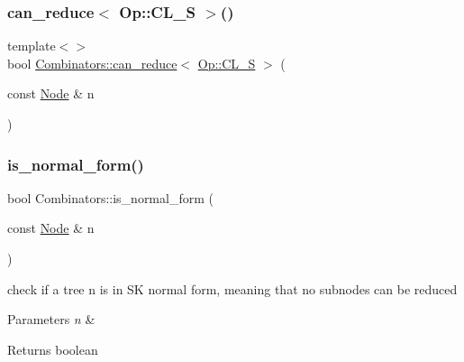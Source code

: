 \mbox{\label{namespace_combinators_aa038cd10e92daa6feb9f9010f705fb33}} 
\subsubsection{\texorpdfstring{can\+\_\+reduce$<$ Op\+::\+C\+L\+\_\+\+S $>$()}{can\_reduce< Op::CL\_S >()}}
{\footnotesize\ttfamily template$<$$>$ \\
bool \hyperlink{namespace_combinators_aa3c93f1edab6764d54dda56aafac9cd3}{Combinators\+::can\+\_\+reduce}$<$ \hyperlink{_ops_8h_a588e6b56097e045c733b60d25c4d45aba7a08f6d182bdbb1be7e6b1eb6092b27b}{Op\+::\+C\+L\+\_\+S} $>$ (\begin{DoxyParamCaption}\item[{const \hyperlink{class_node}{Node} \&}]{n }\end{DoxyParamCaption})}

\mbox{\label{namespace_combinators_a29877c1bfde5b9807fd7a7538efe9e0c}} 
\subsubsection{\texorpdfstring{is\+\_\+normal\+\_\+form()}{is\_normal\_form()}}
{\footnotesize\ttfamily bool Combinators\+::is\+\_\+normal\+\_\+form (\begin{DoxyParamCaption}\item[{const \hyperlink{class_node}{Node} \&}]{n }\end{DoxyParamCaption})}



check if a tree n is in SK normal form, meaning that no subnodes can be reduced 


\begin{DoxyParams}{Parameters}
{\em n} & \\
\hline
\end{DoxyParams}
\begin{DoxyReturn}{Returns}
boolean 
\end{DoxyReturn}
\mbox{\label{namespace_combinators_a6abc966e0ab0f2aa8170712f32541458}} 

